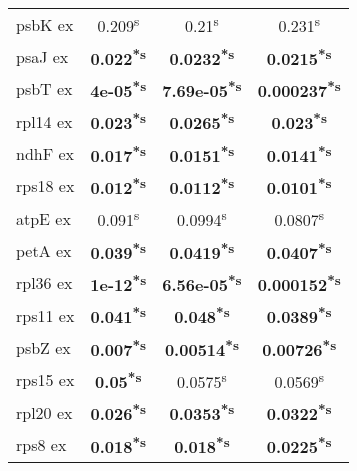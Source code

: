 \documentclass[a4paper]{article}
\begin{document}
\begin{longtable}{l|c|c|c}
psbK ex&0.209\textsuperscript{s}&0.21\textsuperscript{s}&0.231\textsuperscript{s}\\
psaJ ex&\textbf{0.022\textsuperscript{*}\textsuperscript{s}}&\textbf{0.0232\textsuperscript{*}\textsuperscript{s}}&\textbf{0.0215\textsuperscript{*}\textsuperscript{s}}\\
psbT ex&\textbf{4e-05\textsuperscript{*}\textsuperscript{s}}&\textbf{7.69e-05\textsuperscript{*}\textsuperscript{s}}&\textbf{0.000237\textsuperscript{*}\textsuperscript{s}}\\
rpl14 ex&\textbf{0.023\textsuperscript{*}\textsuperscript{s}}&\textbf{0.0265\textsuperscript{*}\textsuperscript{s}}&\textbf{0.023\textsuperscript{*}\textsuperscript{s}}\\
ndhF ex&\textbf{0.017\textsuperscript{*}\textsuperscript{s}}&\textbf{0.0151\textsuperscript{*}\textsuperscript{s}}&\textbf{0.0141\textsuperscript{*}\textsuperscript{s}}\\
rps18 ex&\textbf{0.012\textsuperscript{*}\textsuperscript{s}}&\textbf{0.0112\textsuperscript{*}\textsuperscript{s}}&\textbf{0.0101\textsuperscript{*}\textsuperscript{s}}\\
atpE ex&0.091\textsuperscript{s}&0.0994\textsuperscript{s}&0.0807\textsuperscript{s}\\
petA ex&\textbf{0.039\textsuperscript{*}\textsuperscript{s}}&\textbf{0.0419\textsuperscript{*}\textsuperscript{s}}&\textbf{0.0407\textsuperscript{*}\textsuperscript{s}}\\
rpl36 ex&\textbf{1e-12\textsuperscript{*}\textsuperscript{s}}&\textbf{6.56e-05\textsuperscript{*}\textsuperscript{s}}&\textbf{0.000152\textsuperscript{*}\textsuperscript{s}}\\
rps11 ex&\textbf{0.041\textsuperscript{*}\textsuperscript{s}}&\textbf{0.048\textsuperscript{*}\textsuperscript{s}}&\textbf{0.0389\textsuperscript{*}\textsuperscript{s}}\\
psbZ ex&\textbf{0.007\textsuperscript{*}\textsuperscript{s}}&\textbf{0.00514\textsuperscript{*}\textsuperscript{s}}&\textbf{0.00726\textsuperscript{*}\textsuperscript{s}}\\
rps15 ex&\textbf{0.05\textsuperscript{*}\textsuperscript{s}}&0.0575\textsuperscript{s}&0.0569\textsuperscript{s}\\
rpl20 ex&\textbf{0.026\textsuperscript{*}\textsuperscript{s}}&\textbf{0.0353\textsuperscript{*}\textsuperscript{s}}&\textbf{0.0322\textsuperscript{*}\textsuperscript{s}}\\
rps8 ex&\textbf{0.018\textsuperscript{*}\textsuperscript{s}}&\textbf{0.018\textsuperscript{*}\textsuperscript{s}}&\textbf{0.0225\textsuperscript{*}\textsuperscript{s}}\\

\end{longtable}
\end{document}
